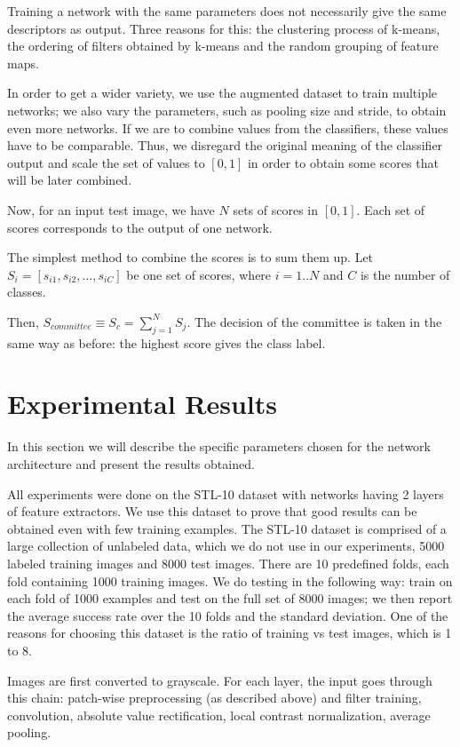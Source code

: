 \documentclass[runningheads]{llncs}
\begin{document}
Training a network with the same parameters does not necessarily give the same descriptors as output. Three reasons for this: the clustering process of k-means, the ordering of filters obtained by k-means and the random grouping of feature maps.

In order to get a wider variety, we use the augmented dataset to train multiple networks; we also vary the parameters, such as pooling size and stride, to obtain even more networks.
If we are to combine values from the classifiers, these values have to be comparable. Thus, we disregard the original meaning of the classifier output and scale the set of values to $[0, 1]$ in order to obtain some scores that will be later combined.

Now, for an input test image, we have $N$ sets of scores in $[0, 1]$. Each set of scores corresponds to the output of one network.

The simplest method to combine the scores is to sum them up.
Let $S_i=[s_{i1}, s_{i2}, ..., s_{iC}]$ be one set of scores, where $i=1..N$ and $C$ is the number of classes.

Then, $S_{committee}\equiv S_c =\sum_{j=1}^N S_j$. The decision of the committee is taken in the same way as before: the highest score gives the class label.

\section{Experimental Results}
In this section we will describe the specific parameters chosen for the network architecture and present the results obtained.

All experiments were done on the STL-10 dataset with networks having 2 layers of feature extractors. We use this dataset to prove that good results can be obtained even with few training examples.
The STL-10 dataset is comprised of a large collection of unlabeled data, which we do not use in our experiments, 5000 labeled training images and 8000 test images. There are 10 predefined folds, each fold containing 1000 training images. We do testing in the following way: train on each fold of 1000 examples and test on the full set of 8000 images; we then report the average success rate over the 10 folds and the standard deviation.
One of the reasons for choosing this dataset is the ratio of training vs test images, which is 1 to 8.

Images are first converted to grayscale. 
For each layer, the input goes through this chain: patch-wise preprocessing (as described above) and filter training, convolution, absolute value rectification, local contrast normalization, average pooling.
\end{document}
